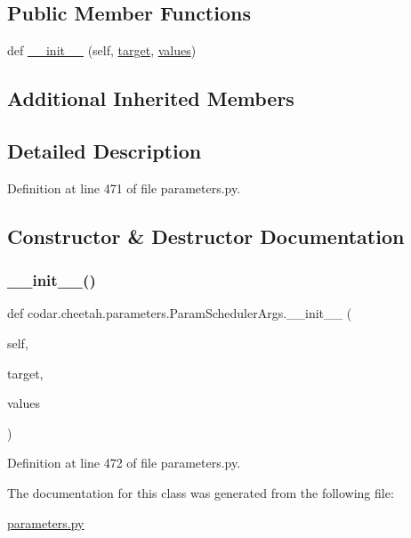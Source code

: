 \subsection*{Public Member Functions}
\begin{DoxyCompactItemize}
\item 
def \hyperlink{classcodar_1_1cheetah_1_1parameters_1_1_param_scheduler_args_abdc6ffa1471d8207fb6de1222791ef87}{\+\_\+\+\_\+init\+\_\+\+\_\+} (self, \hyperlink{classcodar_1_1cheetah_1_1parameters_1_1_param_a5603d43a20cfc6447c3718406ce0669e}{target}, \hyperlink{classcodar_1_1cheetah_1_1parameters_1_1_param_aefcc82658f511bddd6605e6ac6e74fbf}{values})
\end{DoxyCompactItemize}
\subsection*{Additional Inherited Members}


\subsection{Detailed Description}


Definition at line 471 of file parameters.\+py.



\subsection{Constructor \& Destructor Documentation}
\mbox{\label{classcodar_1_1cheetah_1_1parameters_1_1_param_scheduler_args_abdc6ffa1471d8207fb6de1222791ef87}} 
\subsubsection{\texorpdfstring{\+\_\+\+\_\+init\+\_\+\+\_\+()}{\_\_init\_\_()}}
{\footnotesize\ttfamily def codar.\+cheetah.\+parameters.\+Param\+Scheduler\+Args.\+\_\+\+\_\+init\+\_\+\+\_\+ (\begin{DoxyParamCaption}\item[{}]{self,  }\item[{}]{target,  }\item[{}]{values }\end{DoxyParamCaption})}



Definition at line 472 of file parameters.\+py.



The documentation for this class was generated from the following file\+:\begin{DoxyCompactItemize}
\item 
\hyperlink{parameters_8py}{parameters.\+py}\end{DoxyCompactItemize}
